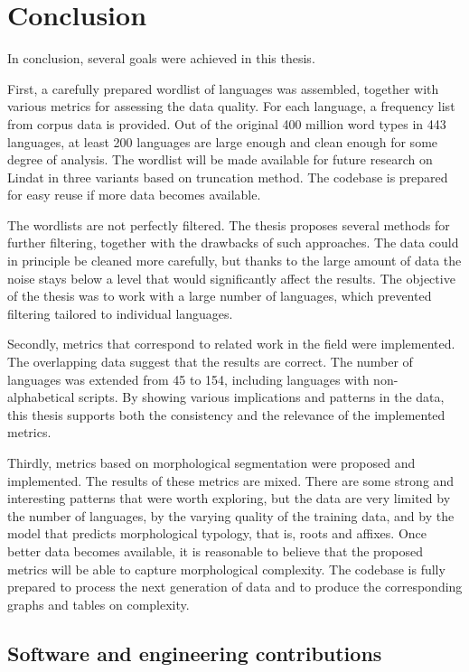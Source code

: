 \chapter{Conclusion}

In conclusion, several goals were achieved in this thesis.

First, a carefully prepared wordlist of languages was assembled, together with various metrics for assessing the data quality. For each language, a frequency list from corpus data is provided. Out of the original 400 million word types in 443 languages, at least 200 languages are large enough and clean enough for some degree of analysis. The wordlist will be made available for future research on Lindat in three variants based on truncation method. The codebase is prepared for easy reuse if more data becomes available.

The wordlists are not perfectly filtered. The thesis proposes several methods for further filtering, together with the drawbacks of such approaches. The data could in principle be cleaned more carefully, but thanks to the large amount of data the noise stays below a level that would significantly affect the results. The objective of the thesis was to work with a large number of languages, which prevented filtering tailored to individual languages.

Secondly, metrics that correspond to related work in the field were implemented. The overlapping data suggest that the results are correct. The number of languages was extended from 45 to 154, including languages with non-alphabetical scripts.
By showing various implications and patterns in the data, this thesis supports both the consistency and the relevance of the implemented metrics.

Thirdly, metrics based on morphological segmentation were proposed and implemented. The results of these metrics are mixed. There are some strong and interesting patterns that were worth exploring, but the data are very limited by the number of languages, by the varying quality of the training data, and by the model that predicts morphological typology, that is, roots and affixes. Once better data becomes available, it is reasonable to believe that the proposed metrics will be able to capture morphological complexity. The codebase is fully prepared to process the next generation of data and to produce the corresponding graphs and tables on complexity.

\section*{Software and engineering contributions}

